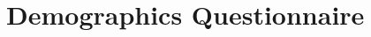 \documentclass{uofsthesis-cs}
\begin{document}
\chapter{Demographics Questionnaire}                                      \label{app:q-dmg}         \noindent{}
\end{document}
